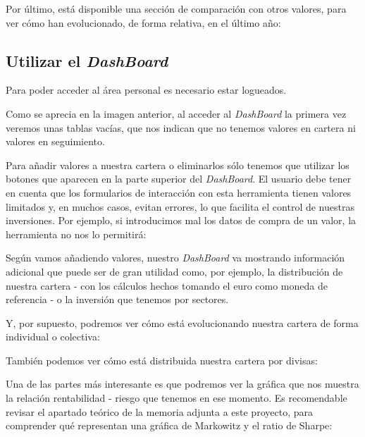 Por último, está disponible una sección de comparación con otros valores, para ver cómo han evolucionado, de forma relativa, en el último año:



\subsection{Utilizar el \emph{DashBoard}}

Para poder acceder al área personal es necesario estar logueados. 


Como se aprecia en la imagen anterior, al acceder al \emph{DashBoard} la primera vez veremos unas tablas vacías, que nos indican que no tenemos valores en cartera ni valores en seguimiento.

Para añadir valores a nuestra cartera o eliminarlos sólo tenemos que utilizar los botones que aparecen en la parte superior del \emph{DashBoard}. El usuario debe tener en cuenta que los formularios de interacción con esta herramienta tienen valores limitados y, en muchos casos, evitan errores, lo que facilita el control de nuestras inversiones. Por ejemplo, si introducimos mal los datos de compra de un valor, la herramienta no nos lo permitirá:


Según vamos añadiendo valores, nuestro \emph{DashBoard} va mostrando información adicional que puede ser de gran utilidad como, por ejemplo, la distribución de nuestra cartera - con los cálculos hechos tomando el euro como moneda de referencia - o la inversión que tenemos por sectores.

Y, por supuesto, podremos ver cómo está evolucionando nuestra cartera de forma individual o colectiva:


\newpage
También podemos ver cómo está distribuida nuestra cartera por divisas:


Una de las partes más interesante es que podremos ver la gráfica que nos muestra la relación rentabilidad - riesgo que tenemos en ese momento. Es recomendable revisar el apartado teórico de la memoria adjunta a este proyecto, para comprender qué representan una gráfica de Markowitz y el ratio de Sharpe:


